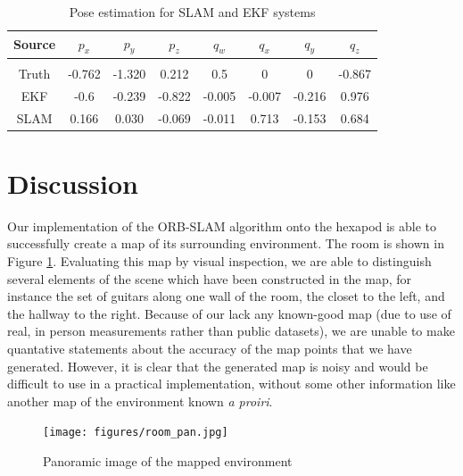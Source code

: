 \documentclass[twocolumn]{article}
\begin{document}
\begin{table}[h!]
\begin{adjustbox}{width=0.5\textwidth}
\begin{tabularx}{0.6\textwidth}{ ||c c c c c c c c ||}

    \hline
    Source & $p_x$ & $p_y$ & $p_z$ & $q_w$ & $q_x$ & $q_y$ & $q_z$ \\
    \hline \\
    Truth & -0.762 & -1.320 & 0.212 & 0.5 & 0 & 0 & -0.867 \\
    EKF & -0.6 & -0.239 & -0.822 & -0.005 & -0.007 & -0.216 & 0.976 \\
    SLAM & 0.166 & 0.030 & -0.069 & -0.011 & 0.713 & -0.153 & 0.684 \\
    \hline

\end{tabularx}
\end{adjustbox}
\caption{Pose estimation for SLAM and EKF systems}
\label{table:pose_data}
\end{table}


\section{ Discussion }

Our implementation of the ORB-SLAM algorithm onto the hexapod is able to successfully create a map of its surrounding environment. The room is shown in Figure \ref{fig:room}. Evaluating this map by visual inspection, we are able to distinguish several elements of the scene which have been constructed in the map, for instance the set of guitars along one wall of the room, the closet to the left, and the hallway to the right. Because of our lack any known-good map (due to use of real, in person measurements rather than public datasets), we are unable to make quantative statements about the accuracy of the map points that we have generated. However, it is clear that the generated map is noisy and would be difficult to use in a practical implementation, without some other information like another map of the environment known \emph{a proiri}.

\begin{figure}[h]
    \centering
    \texttt{[image: figures/room\_pan.jpg]}
    \caption{ Panoramic image of the mapped environment }
    \label{fig:room}
\end{figure}
\end{document}
